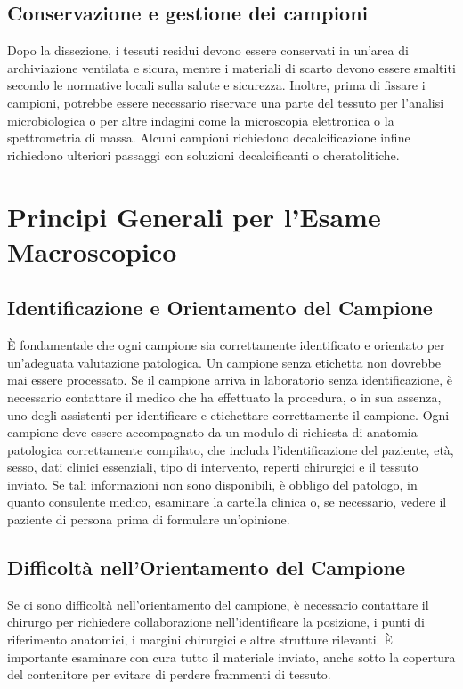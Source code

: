\subsection{Conservazione e gestione dei campioni}
Dopo la dissezione, i tessuti residui devono essere conservati in un'area di archiviazione ventilata e sicura, mentre i materiali di scarto devono essere smaltiti secondo le normative locali sulla salute e sicurezza. Inoltre, prima di fissare i campioni, potrebbe essere necessario riservare una parte del tessuto per l'analisi microbiologica o per altre indagini come la microscopia elettronica o la spettrometria di massa. Alcuni campioni richiedono decalcificazione infine richiedono ulteriori passaggi con soluzioni decalcificanti o cheratolitiche.

\section{Principi Generali per l'Esame Macroscopico}

\subsection{Identificazione e Orientamento del Campione}
È fondamentale che ogni campione sia correttamente identificato e orientato per un'adeguata valutazione patologica. Un campione senza etichetta non dovrebbe mai essere processato. Se il campione arriva in laboratorio senza identificazione, è necessario contattare il medico che ha effettuato la procedura, o in sua assenza, uno degli assistenti per identificare e etichettare correttamente il campione. Ogni campione deve essere accompagnato da un modulo di richiesta di anatomia patologica correttamente compilato, che includa l'identificazione del paziente, età, sesso, dati clinici essenziali, tipo di intervento, reperti chirurgici e il tessuto inviato. Se tali informazioni non sono disponibili, è obbligo del patologo, in quanto consulente medico, esaminare la cartella clinica o, se necessario, vedere il paziente di persona prima di formulare un'opinione.

\subsection{Difficoltà nell'Orientamento del Campione}
Se ci sono difficoltà nell'orientamento del campione, è necessario contattare il chirurgo per richiedere collaborazione nell'identificare la posizione, i punti di riferimento anatomici, i margini chirurgici e altre strutture rilevanti. È importante esaminare con cura tutto il materiale inviato, anche sotto la copertura del contenitore per evitare di perdere frammenti di tessuto.

